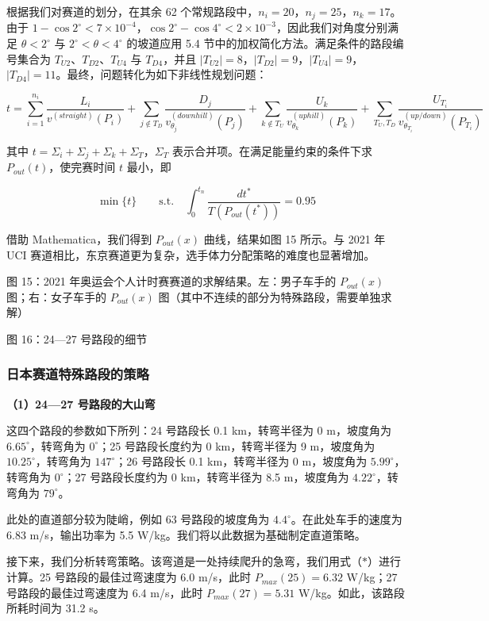 \documentclass[11pt,a4paper]{ctexart}
\begin{document}
根据我们对赛道的划分，在其余 62 个常规路段中，$n_i=20$，$n_j=25$，$n_k=17$。由于 $1-\cos 2^{\circ}<7\times 10^{-4}$，$\cos 2^{\circ}-\cos 4^{\circ}<2\times 10^{-3}$，因此我们对角度分别满足 $\theta<2^{\circ}$ 与 $2^{\circ}<\theta<4^{\circ}$ 的坡道应用 5.4 节中的加权简化方法。满足条件的路段编号集合为 $T_{U2}$、$T_{D2}$、$T_{U4}$ 与 $T_{D4}$，并且 $|T_{U2}|=8$，$|T_{D2}|=9$，$|T_{U4}|=9$，$|T_{D4}|=11$。最终，问题转化为如下非线性规划问题：

\[
t=\sum_{i=1}^{n_i}\frac{L_i}{v^{(straight)}(P_i)}+\sum_{j\notin T_D}\frac{D_j}{v^{(downhill)}_{\theta_j}(P_j)}+\sum_{k\notin T_U}\frac{U_k}{v^{(uphill)}_{\theta_k}(P_k)}+\sum_{T_U,T_D}\frac{U_{T_i}}{v^{(up/down)}_{\theta_{T_i}}(P_{T_i})}
\]

其中 $t=\Sigma_i+\Sigma_j+\Sigma_k+\Sigma_T$，$\Sigma_T$ 表示合并项。在满足能量约束的条件下求 $P_{out}(t)$，使完赛时间 $t$ 最小，即

\[
\min\{t\}\qquad\mathrm{s.t.}\quad\int_0^{t_n}\frac{dt^{\ast}}{T\left(P_{out}(t^{\ast})\right)}=0.95
\]

借助 Mathematica，我们得到 $P_{out}(x)$ 曲线，结果如图 15 所示。与 2021 年 UCI 赛道相比，东京赛道更为复杂，选手体力分配策略的难度也显著增加。

图 15：2021 年奥运会个人计时赛赛道的求解结果。左：男子车手的 $P_{out}(x)$ 图；右：女子车手的 $P_{out}(x)$ 图（其中不连续的部分为特殊路段，需要单独求解）

图 16：24—27 号路段的细节

\subsubsection{日本赛道特殊路段的策略}

\textbf{（1）24—27 号路段的大山弯}

这四个路段的参数如下所列：24 号路段长 0.1 km，转弯半径为 0 m，坡度角为 $6.65^{\circ}$，转弯角为 $0^{\circ}$；25 号路段长度约为 0 km，转弯半径为 9 m，坡度角为 $10.25^{\circ}$，转弯角为 $147^{\circ}$；26 号路段长 0.1 km，转弯半径为 0 m，坡度角为 $5.99^{\circ}$，转弯角为 $0^{\circ}$；27 号路段长度约为 0 km，转弯半径为 8.5 m，坡度角为 $4.22^{\circ}$，转弯角为 $79^{\circ}$。

此处的直道部分较为陡峭，例如 63 号路段的坡度角为 $4.4^{\circ}$。在此处车手的速度为 6.83 m/s，输出功率为 5.5 W/kg。我们将以此数据为基础制定直道策略。

接下来，我们分析转弯策略。该弯道是一处持续爬升的急弯，我们用式（$\ast$）进行计算。25 号路段的最佳过弯速度为 6.0 m/s，此时 $P_{max}(25)=6.32$ W/kg；27 号路段的最佳过弯速度为 6.4 m/s，此时 $P_{max}(27)=5.31$ W/kg。如此，该路段所耗时间为 31.2 s。
\end{document}
